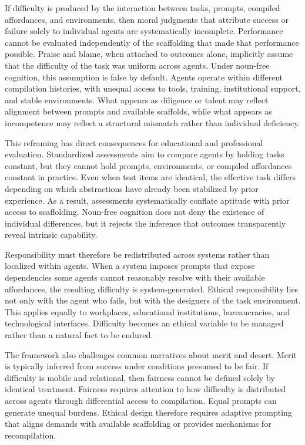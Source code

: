 \documentclass[12pt]{article}
\begin{document}
If difficulty is produced by the interaction between tasks, prompts, compiled affordances, and environments, then moral judgments that attribute success or failure solely to individual agents are systematically incomplete. Performance cannot be evaluated independently of the scaffolding that made that performance possible. Praise and blame, when attached to outcomes alone, implicitly assume that the difficulty of the task was uniform across agents. Under noun-free cognition, this assumption is false by default. Agents operate within different compilation histories, with unequal access to tools, training, institutional support, and stable environments. What appears as diligence or talent may reflect alignment between prompts and available scaffolds, while what appears as incompetence may reflect a structural mismatch rather than individual deficiency.

This reframing has direct consequences for educational and professional evaluation. Standardized assessments aim to compare agents by holding tasks constant, but they cannot hold prompts, environments, or compiled affordances constant in practice. Even when test items are identical, the effective task differs depending on which abstractions have already been stabilized by prior experience. As a result, assessments systematically conflate aptitude with prior access to scaffolding. Noun-free cognition does not deny the existence of individual differences, but it rejects the inference that outcomes transparently reveal intrinsic capability.

Responsibility must therefore be redistributed across systems rather than localized within agents. When a system imposes prompts that expose dependencies some agents cannot reasonably resolve with their available affordances, the resulting difficulty is system-generated. Ethical responsibility lies not only with the agent who fails, but with the designers of the task environment. This applies equally to workplaces, educational institutions, bureaucracies, and technological interfaces. Difficulty becomes an ethical variable to be managed rather than a natural fact to be endured.

The framework also challenges common narratives about merit and desert. Merit is typically inferred from success under conditions presumed to be fair. If difficulty is mobile and relational, then fairness cannot be defined solely by identical treatment. Fairness requires attention to how difficulty is distributed across agents through differential access to compilation. Equal prompts can generate unequal burdens. Ethical design therefore requires adaptive prompting that aligns demands with available scaffolding or provides mechanisms for recompilation.
\end{document}
